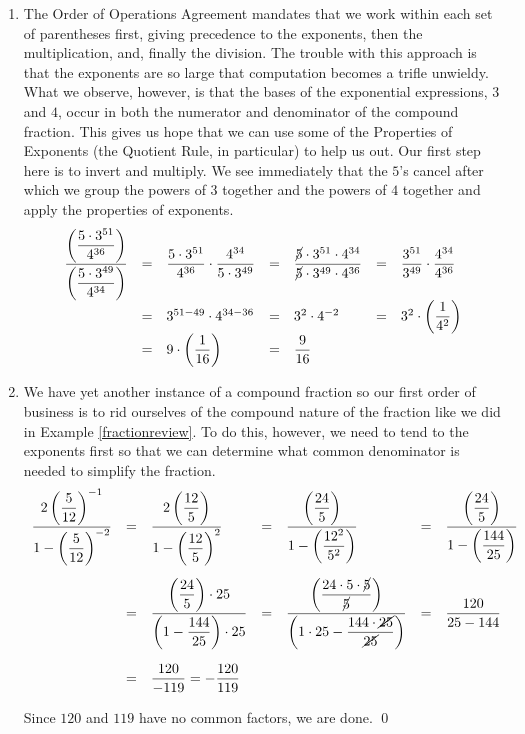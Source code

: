 \begin{ex}
\begin{enumerate}
\item  The Order of Operations Agreement mandates that we work within each set of parentheses first, giving precedence to the exponents, then the multiplication, and, finally the division.  The trouble with this approach is that the exponents are so large that computation becomes a trifle unwieldy.   What we observe, however, is that the bases of the exponential expressions, $3$ and $4$, occur in both the numerator and denominator of the compound fraction.  This gives us hope that we can use some of the Properties of Exponents (the Quotient Rule, in particular) to help us out. Our first step here is to invert and multiply.  We see immediately that the $5$'s cancel after which we group the powers of $3$ together and the powers of $4$ together and apply the properties of exponents.\[ \begin{array}{rclclcl}

\dfrac{\left(\dfrac{5\cdot 3^{51}}{4^{36}}\right)}{\left(\dfrac{5 \cdot 3^{49}}{4^{34}}\right)} & = & \dfrac{5\cdot 3^{51}}{4^{36}} \cdot \dfrac{4^{34}}{5 \cdot 3^{49}} & = & \dfrac{\cancel{5} \cdot 3^{51} \cdot 4^{34}}{\cancel{5} \cdot 3^{49} \cdot 4^{36}} & = & \dfrac{3^{51}}{3^{49}} \cdot\dfrac{4^{34}}{4^{36}} \\

& = & 3^{51-49} \cdot 4^{34-36} & = & 3^{2} \cdot 4^{-2} & = & 3^{2} \cdot \left( \dfrac{1}{4^2}\right) \\

& = & 9 \cdot \left(\dfrac{1}{16} \right) & = & \dfrac{9}{16} & & \\ \end{array} \]

\item We have yet another instance of a compound fraction so our first order of business is to rid ourselves of the compound nature of the fraction like we did in Example \ref{fractionreview}.  To do this, however, we need to tend to the exponents first so that we can determine what common denominator is needed to simplify the fraction.\[ \begin{array}{rclclcl} \dfrac{2 \left(\dfrac{5}{12}\right)^{-1}}{1 - \left(\dfrac{5}{12}\right)^{-2}} & = & \dfrac{2 \left(\dfrac{12}{5}\right)}{1 - \left(\dfrac{12}{5}\right)^{2}} & = & \dfrac{\left(\dfrac{24}{5}\right)}{1 - \left(\dfrac{12^2}{5^2}\right)} & = & \dfrac{\left(\dfrac{24}{5}\right)}{1 - \left(\dfrac{144}{25}\right)} \\ [30pt]

& = & \dfrac{\left(\dfrac{24}{5}\right) \cdot 25}{\left(1 - \dfrac{144}{25}\right)\cdot 25} & = & \dfrac{\left(\dfrac{24\cdot 5 \cdot \cancel{5}}{\cancel{5}}\right)}{\left(1 \cdot 25 - \dfrac{144 \cdot \cancel{25}}{\cancel{25}}\right)} & = & \dfrac{120}{25-144} \\ [30pt]
& = & \dfrac{120}{-119} = -\dfrac{120}{119} & & & & \\  \end{array} \]

Since $120$ and $119$ have no common factors, we are done.  \qed

\end{enumerate}

\end{ex}

